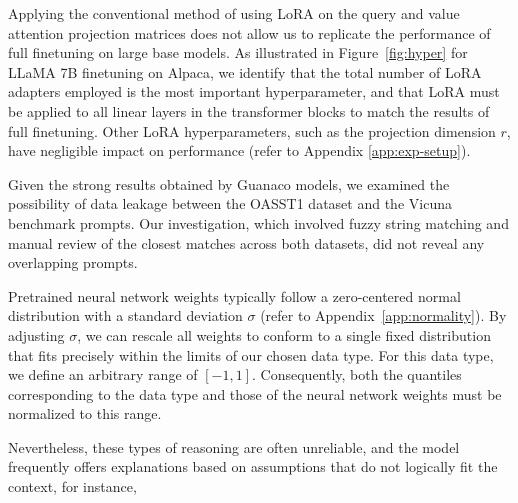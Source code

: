 Applying the conventional method of using LoRA on the query and value attention projection matrices \citep{hu2021lora} does not allow us to replicate the performance of full finetuning on large base models. As illustrated in Figure~\ref{fig:hyper} for LLaMA 7B finetuning on Alpaca, we identify that the total number of LoRA adapters employed is the most important hyperparameter, and that LoRA must be applied to all linear layers in the transformer blocks to match the results of full finetuning. Other LoRA hyperparameters, such as the projection dimension $r$, have negligible impact on performance (refer to Appendix \ref{app:exp-setup}).

Given the strong results obtained by {Guanaco} models, we examined the possibility of data leakage between the OASST1 dataset and the Vicuna benchmark prompts. Our investigation, which involved fuzzy string matching and manual review of the closest matches across both datasets, did not reveal any overlapping prompts.

Pretrained neural network weights typically follow a zero-centered normal distribution with a standard deviation $\sigma$ (refer to Appendix~\ref{app:normality}). By adjusting $\sigma$, we can rescale all weights to conform to a single fixed distribution that fits precisely within the limits of our chosen data type. For this data type, we define an arbitrary range of $[-1, 1]$. Consequently, both the quantiles corresponding to the data type and those of the neural network weights must be normalized to this range.

Nevertheless, these types of reasoning are often unreliable, and the model frequently offers explanations based on assumptions that do not logically fit the context, for instance,

